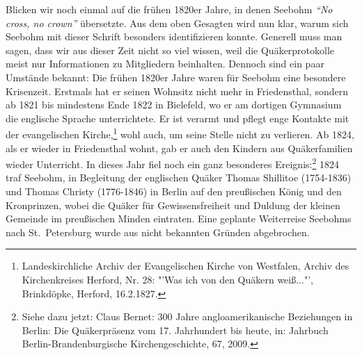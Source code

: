 Blicken wir noch einmal auf die frühen 1820er Jahre, in denen Seebohm \textit{"`No
cross, no crown"'} übersetzte. Aus dem oben Gesagten wird nun klar, warum sich Seebohm
mit dieser Schrift besonders identifizieren konnte. Generell muss man sagen,
dass wir aus dieser Zeit nicht so viel wissen, weil die Quäkerprotokolle meist
nur Informationen zu Mitgliedern beinhalten. Dennoch sind ein paar Umstände
bekannt: Die frühen 1820er Jahre waren für Seebohm eine besondere Krisenzeit.
Erstmals hat er seinen Wohnsitz nicht mehr in Friedensthal, sondern ab 1821 bis
mindestens Ende 1822 in Bielefeld, wo er am dortigen Gymnasium die englische
Sprache unterrichtete. Er ist verarmt und pflegt enge Kontakte mit der
evangelischen Kirche,\footnote{Landeskirchliche Archiv der Evangelischen Kirche
von Westfalen, Archiv des
Kirchenkreises Herford, Nr. 28: "'Was ich von den Quäkern weiß..."', Brinkdöpke,
Herford, 16.2.1827.} wohl auch, um seine Stelle nicht zu verlieren. Ab
1824, als er wieder in Friedensthal wohnt, gab er auch den Kindern aus
Quäkerfamilien wieder Unterricht. In dieses Jahr fiel noch ein ganz besonderes
Ereignis:\footnote{Siehe dazu jetzt: Claus Bernet: 300 Jahre angloamerikanische
Beziehungen in
Berlin: Die Quäkerpräsenz vom 17. Jahrhundert bis heute, in: Jahrbuch
Berlin-Brandenburgische Kirchengeschichte, 67, 2009.} 1824 traf Seebohm, in
Begleitung der englischen Quäker Thomas Shillitoe (1754-1836) und Thomas Christy
(1776-1846) in Berlin auf den preußischen König und den Kronprinzen, wobei die
Quäker für Gewissensfreiheit und Duldung der kleinen Gemeinde im preußischen
Minden eintraten. Eine geplante Weiterreise Seebohms nach St.~Petersburg wurde
aus nicht bekannten Gründen abgebrochen.

\medskip

